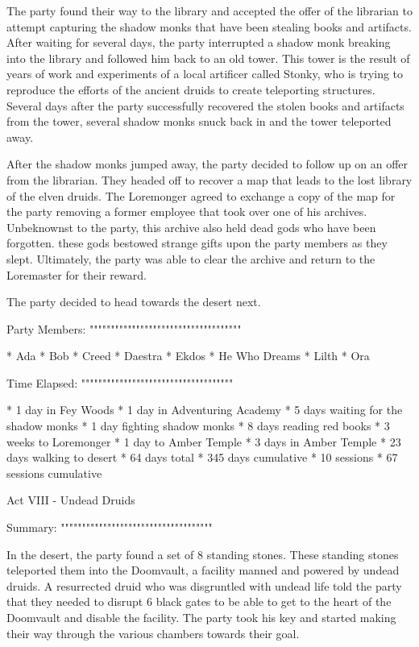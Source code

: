 The party found their way to the library and accepted the offer of the librarian to attempt capturing the shadow monks that have been stealing books and artifacts.
After waiting for several days, the party interrupted a shadow monk breaking into the library and followed him back to an old tower.
This tower is the result of years of work and experiments of a local artificer called Stonky, who is trying to reproduce the efforts of the ancient druids to create teleporting structures.
Several days after the party successfully recovered the stolen books and artifacts from the tower, several shadow monks snuck back in and the tower teleported away.

After the shadow monks jumped away, the party decided to follow up on an offer from the librarian.
They headed off to recover a map that leads to the lost library of the elven druids.
The Loremonger agreed to exchange a copy of the map for the party removing a former employee that took over one of his archives.
Unbeknownst to the party, this archive also held dead gods who have been forgotten.
these gods bestowed strange gifts upon the party members as they slept.
Ultimately, the party was able to clear the archive and return to the Loremaster for their reward.

The party decided to head towards the desert next.

Party Members:
""""""""""""""""""""""""""""""""""""

  * Ada
  * Bob
  * Creed
  * Daestra
  * Ekdos
  * He Who Dreams
  * Lilth
  * Ora

Time Elapsed:
""""""""""""""""""""""""""""""""""""

  * 1 day in Fey Woods
  * 1 day in Adventuring Academy
  * 5 days waiting for the shadow monks
  * 1 day fighting shadow monks
  * 8 days reading red books
  * 3 weeks to Loremonger
  * 1 day to Amber Temple
  * 3 days in Amber Temple
  * 23 days walking to desert
  * 64 days total
  * 345 days cumulative
  * 10 sessions
  * 67 sessions cumulative

Act VIII - Undead Druids
^^^^^^^^^^^^^^^^^^^^^^^^^^^^^^^^^^^^

Summary:
""""""""""""""""""""""""""""""""""""

In the desert, the party found a set of 8 standing stones.
These standing stones teleported them into the Doomvault, a facility manned and powered by undead druids.
A resurrected druid who was disgruntled with undead life told the party that they needed to disrupt 6 black gates to be able to get to the heart of the Doomvault and disable the facility.
The party took his key and started making their way through the various chambers towards their goal.

